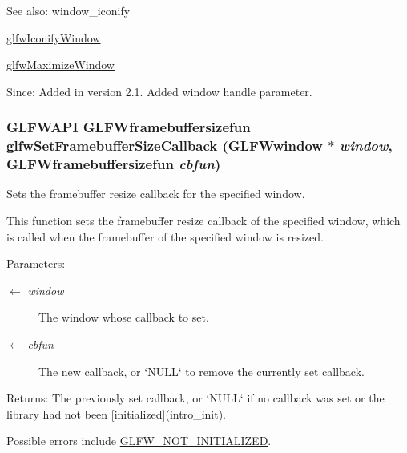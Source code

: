 \begin{Desc}
\item[See also:]window\_\-iconify 

\hyperlink{group__window_g24274e3c6ecd44e11fec5e6b66e4d7f3}{glfwIconifyWindow} 

\hyperlink{group__window_g4f825a55367d3fabde3d06e7f30128e8}{glfwMaximizeWindow}\end{Desc}
\begin{Desc}
\item[Since:]Added in version 2.1.  Added window handle parameter. \end{Desc}
\hypertarget{group__window_gd766bcdb4465f9c6c62e5d8ca7cfba56}{
\subsubsection[glfwSetFramebufferSizeCallback]{\setlength{\rightskip}{0pt plus 5cm}GLFWAPI {\bf GLFWframebuffersizefun} glfwSetFramebufferSizeCallback ({\bf GLFWwindow} $\ast$ {\em window}, \/  {\bf GLFWframebuffersizefun} {\em cbfun})}}
\label{group__window_gd766bcdb4465f9c6c62e5d8ca7cfba56}


Sets the framebuffer resize callback for the specified window. 

This function sets the framebuffer resize callback of the specified window, which is called when the framebuffer of the specified window is resized.

\begin{Desc}
\item[Parameters:]
\begin{description}
\item[\mbox{$\leftarrow$} {\em window}]The window whose callback to set. \item[\mbox{$\leftarrow$} {\em cbfun}]The new callback, or `NULL` to remove the currently set callback. \end{description}
\end{Desc}
\begin{Desc}
\item[Returns:]The previously set callback, or `NULL` if no callback was set or the library had not been \mbox{[}initialized\mbox{]}(intro\_\-init).\end{Desc}
Possible errors include \hyperlink{group__errors_g2374ee02c177f12e1fa76ff3ed15e14a}{GLFW\_\-NOT\_\-INITIALIZED}.

